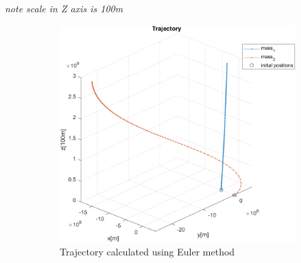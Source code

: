 \documentclass[english,12pt,a4paper, notitlepage]{report}
\begin{document}
	\emph{note scale in Z axis is 100m}
	\begin{figure}[h!]
		\centering
		\begin{subfigure}[b]{0.4\textwidth}
			\includegraphics[height=0.3\textheight]{trj_euler.png}
			\caption{Trajectory calculated using Euler method}
		\end{subfigure}
		\hfill
		\begin{subfigure}[b]{0.4\textwidth}

\end{subfigure}
\end{figure}
\end{document}
